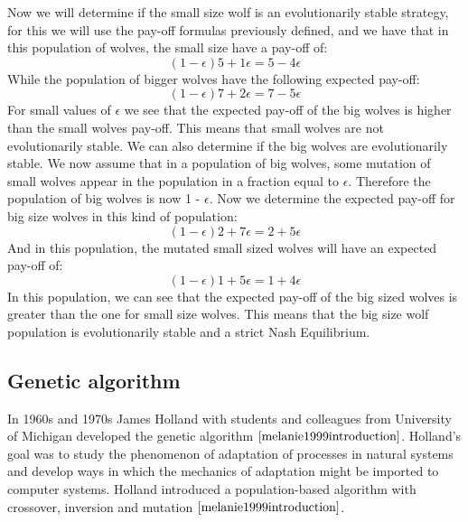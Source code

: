 Now we will determine if the small size wolf is an evolutionarily stable strategy, for this we will use the pay-off formulas previously defined, and we have that in this population of wolves, the small size have a pay-off of:
\begin{equation}
(1-{\epsilon})5 + 1{\epsilon} = 5 - 4{\epsilon}
\end{equation}
While the population of bigger wolves have the following expected pay-off:
\begin{equation}
(1-{\epsilon})7 + 2{\epsilon} = 7 - 5{\epsilon}
\end{equation}
For small values of $\epsilon$ we see that the expected pay-off of the big wolves is higher than the small wolves pay-off.  This means that small wolves are not evolutionarily stable.
We can also determine if the big wolves are evolutionarily stable. We now assume that in a population of big wolves, some mutation of small wolves appear in the population in a fraction equal to $\epsilon$. Therefore the population of big wolves is now 1 - $\epsilon$. Now we determine the expected pay-off for big size wolves in this kind of population:
 \begin{equation}
(1-{\epsilon})2 + 7{\epsilon} = 2 + 5{\epsilon}
\end{equation}
And in this population, the mutated small sized wolves will have an expected pay-off of:
\begin{equation}
(1-{\epsilon})1 + 5{\epsilon} = 1 + 4{\epsilon}
\end{equation}
In this population, we can see that the expected pay-off of the big sized wolves is greater than the one for small size wolves. This means that the big size wolf population is evolutionarily stable and a strict Nash Equilibrium.

\subsection{Genetic algorithm} \label{sec:genalg}
 In 1960s and 1970s James Holland with students and colleagues from University of Michigan developed the genetic algorithm $\cite{melanie1999introduction}$. Holland's goal was to study the phenomenon of adaptation of processes in natural systems and develop ways in which the mechanics of adaptation might be imported to computer systems. Holland introduced a population-based algorithm with crossover, inversion and mutation $\cite{melanie1999introduction}$.

